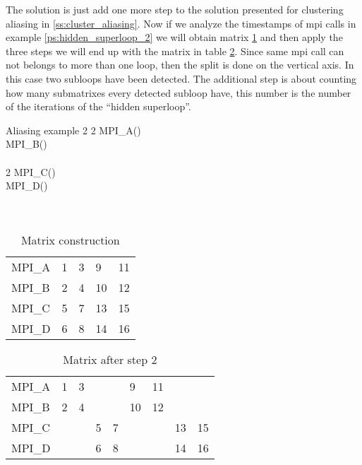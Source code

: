 The solution is just add one more step to the solution presented for clustering
aliasing in \ref{ss:cluster_aliasing}. Now if we analyze the timestamps of mpi
calls in example \ref{ps:hidden_superloop_2} we will obtain matrix
\ref{tb:matrix_3} and then apply the three steps we will
end up with the matrix in table \ref{tb:matrix_4}. Since same mpi call can not 
belongs to more than one loop, then the split is done on the vertical axis. In 
this case two subloops have been detected. The additional step is about
counting how many submatrixes every detected subloop have, this number is the
number of the iterations of the ``hidden superloop''.

\begin{pseudocode}{Aliasing example}{ }
    \label{ps:hidden_superloop_2}
      2 \DO
    \BEGIN
          2 \DO
        \BEGIN
            MPI\_A() \\
            MPI\_B() \\
        \END \\
          2 \DO
        \BEGIN
            MPI\_C() \\
            MPI\_D() \\
        \END\\
    \END \\
\end{pseudocode}

\begin{table}[]
\centering
\caption{Matrix construction}
\label{tb:matrix_3}
\begin{tabular}{lllll}
MPI\_A & 1 & 3 & 9  & 11 \\
MPI\_B & 2 & 4 & 10 & 12 \\
MPI\_C & 5 & 7 & 13 & 15 \\
MPI\_D & 6 & 8 & 14 & 16
\end{tabular}
\end{table}

\begin{table}[]
\centering
\caption{Matrix after step 2}
\label{tb:matrix_4}
\begin{tabular}{lllllllll}
MPI\_A & 1 & 3 &   &   & 9  & 11 &    &    \\
MPI\_B & 2 & 4 &   &   & 10 & 12 &    &    \\
MPI\_C &   &   & 5 & 7 &    &    & 13 & 15 \\
MPI\_D &   &   & 6 & 8 &    &    & 14 & 16
\end{tabular}
\end{table}
